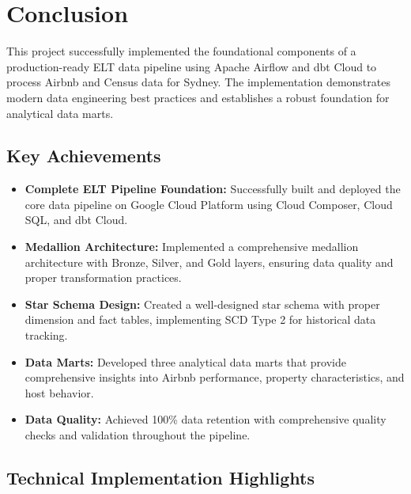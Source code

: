 \section{Conclusion}

This project successfully implemented the foundational components of a production-ready ELT data pipeline using Apache Airflow and dbt Cloud to process Airbnb and Census data for Sydney. The implementation demonstrates modern data engineering best practices and establishes a robust foundation for analytical data marts.

\subsection{Key Achievements}

\begin{itemize}
  \item \textbf{Complete ELT Pipeline Foundation:} Successfully built and deployed the core data pipeline on Google Cloud Platform using Cloud Composer, Cloud SQL, and dbt Cloud.
  
  \item \textbf{Medallion Architecture:} Implemented a comprehensive medallion architecture with Bronze, Silver, and Gold layers, ensuring data quality and proper transformation practices.
  
  \item \textbf{Star Schema Design:} Created a well-designed star schema with proper dimension and fact tables, implementing SCD Type 2 for historical data tracking.
  
  \item \textbf{Data Marts:} Developed three analytical data marts that provide comprehensive insights into Airbnb performance, property characteristics, and host behavior.
  
  \item \textbf{Data Quality:} Achieved 100\% data retention with comprehensive quality checks and validation throughout the pipeline.
\end{itemize}

\subsection{Technical Implementation Highlights}

